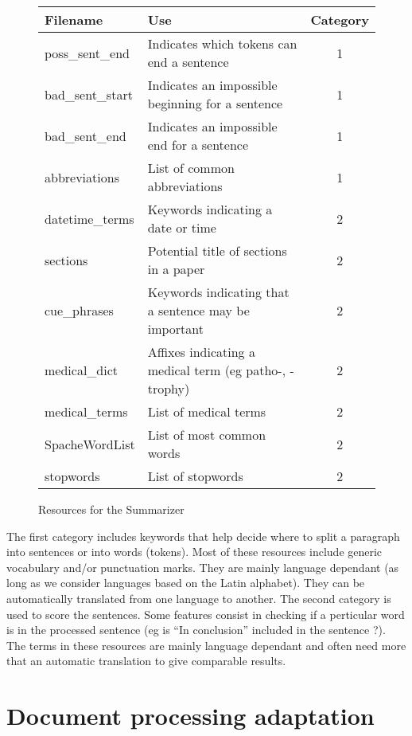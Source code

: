 \documentclass[a4paper,10pt]{article}
\begin{document}
\begin{figure}[H]
  \centering
  \begin{tabular}[h]{|l|l|c|}
    \hline
    Filename & Use & Category \\
    \hline
    poss\_sent\_end & Indicates which tokens can end a sentence & 1\\
    bad\_sent\_start & Indicates an impossible beginning for a
    sentence & 1\\
    bad\_sent\_end & Indicates an impossible end for a sentence & 1\\
    abbreviations & List of common abbreviations & 1\\
    \hline
    datetime\_terms & Keywords indicating a date or time & 2\\
    sections & Potential title of sections in a paper & 2\\
    cue\_phrases & Keywords indicating that a sentence may be
    important & 2\\
    medical\_dict & Affixes indicating a medical term (eg patho-,
    -trophy) & 2\\
    medical\_terms & List of medical terms & 2\\
    SpacheWordList & List of most common words & 2\\
    stopwords & List of stopwords & 2\\
    \hline
    
  \end{tabular}
  \caption{Resources for the Summarizer}
  \label{fig:enresources}
\end{figure}

The first category includes keywords that help decide where to split
a paragraph into sentences or into words (tokens). Most of these
resources include generic vocabulary and/or punctuation marks. They
are mainly language dependant (as long as we consider languages based
on the Latin alphabet). They can be automatically translated from one
language to another.
The second category is used to score the sentences. Some features
consist in checking if a perticular word is in the processed sentence
(eg is ``In conclusion'' included in the sentence ?). The terms in
these resources are mainly language dependant and often need more that
an automatic translation to give comparable results.


\section{Document processing adaptation}
\label{sec:docproc}
\end{document}
